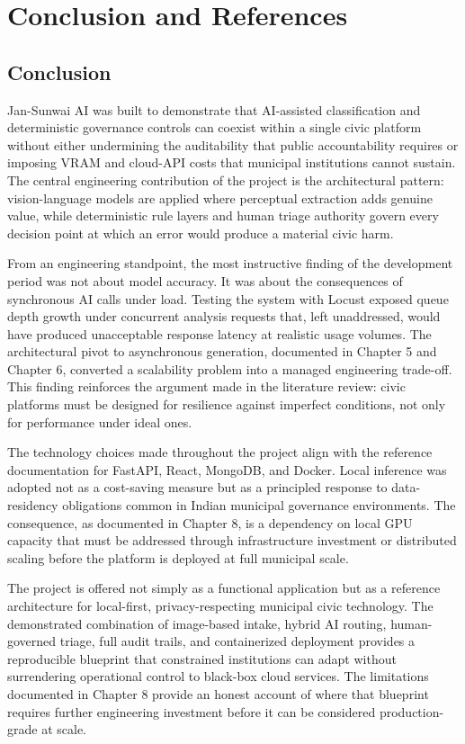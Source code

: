 \chapter{Conclusion and References}

\section{Conclusion}

Jan-Sunwai AI was built to demonstrate that AI-assisted classification and deterministic governance controls can coexist within a single civic platform without either undermining the auditability that public accountability requires or imposing VRAM and cloud-API costs that municipal institutions cannot sustain. The central engineering contribution of the project is the architectural pattern: vision-language models are applied where perceptual extraction adds genuine value, while deterministic rule layers and human triage authority govern every decision point at which an error would produce a material civic harm.

From an engineering standpoint, the most instructive finding of the development period was not about model accuracy. It was about the consequences of synchronous AI calls under load. Testing the system with Locust exposed queue depth growth under concurrent analysis requests that, left unaddressed, would have produced unacceptable response latency at realistic usage volumes. The architectural pivot to asynchronous generation, documented in Chapter 5 and Chapter 6, converted a scalability problem into a managed engineering trade-off. This finding reinforces the argument made in the literature review: civic platforms must be designed for resilience against imperfect conditions, not only for performance under ideal ones.

The technology choices made throughout the project align with the reference documentation for FastAPI, React, MongoDB, and Docker. Local inference was adopted not as a cost-saving measure but as a principled response to data-residency obligations common in Indian municipal governance environments. The consequence, as documented in Chapter 8, is a dependency on local GPU capacity that must be addressed through infrastructure investment or distributed scaling before the platform is deployed at full municipal scale.

The project is offered not simply as a functional application but as a reference architecture for local-first, privacy-respecting municipal civic technology. The demonstrated combination of image-based intake, hybrid AI routing, human-governed triage, full audit trails, and containerized deployment provides a reproducible blueprint that constrained institutions can adapt without surrendering operational control to black-box cloud services. The limitations documented in Chapter 8 provide an honest account of where that blueprint requires further engineering investment before it can be considered production-grade at scale.

